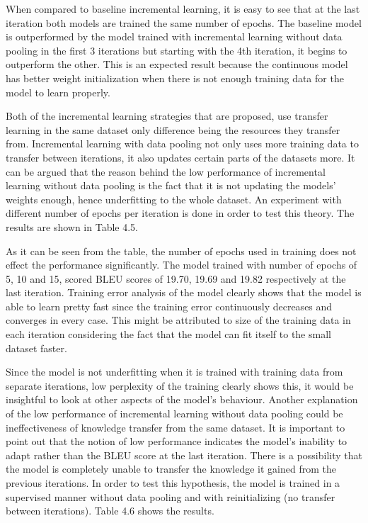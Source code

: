When compared to baseline incremental learning, it is easy to see that at the last iteration both models are trained the same number of epochs. The baseline model is outperformed by the model trained with incremental learning without data pooling in the first 3 iterations but starting with the 4th iteration, it begins to outperform the other. This is an expected result because the continuous model has better weight initialization when there is not enough training data for the model to learn properly.

Both of the incremental learning strategies that are proposed, use transfer learning in the same dataset only difference being the resources they transfer from. Incremental learning with data pooling not only uses more training data to transfer between iterations, it also updates certain parts of the datasets more. It can be argued that the reason behind the low performance of incremental learning without data pooling is the fact that it is not updating the models' weights enough, hence underfitting to the whole dataset. An experiment with different number of epochs per iteration is done in order to test this theory. The results are shown in Table 4.5.

As it can be seen from the table, the number of epochs used in training does not effect the performance significantly. The model trained with number of epochs of 5, 10 and 15, scored BLEU scores of 19.70, 19.69 and 19.82 respectively at the last iteration. Training error analysis of the model clearly shows that the model is able to learn pretty fast since the training error continuously decreases and converges in every case. This might be attributed to size of the training data in each iteration considering the fact that the model can fit itself to the small dataset faster.

Since the model is not underfitting when it is trained with training data from separate iterations, low perplexity of the training clearly shows this, it would be insightful to look at other aspects of the model's behaviour. Another explanation of the low performance of incremental learning without data pooling could be ineffectiveness of knowledge transfer from the same dataset. It is important to point out that the notion of low performance indicates the model's inability to adapt rather than the BLEU score at the last iteration. There is a possibility that the model is completely unable to transfer the knowledge it gained from the previous iterations. In order to test this hypothesis, the model is trained in a supervised manner without data pooling and with reinitializing (no transfer between iterations). Table 4.6 shows the results. 

